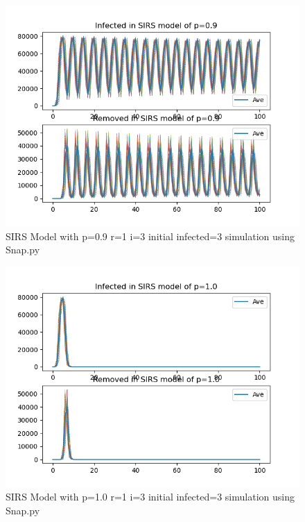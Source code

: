\documentclass{subfile}
\begin{document}
  \begin{figure}
  \includegraphics[scale=0.8]{sirsp09r1i3s3}
  \caption[SIRS p=0.9,r=1,i=3,init infected=3]{SIRS Model with p=0.9 r=1 i=3 initial infected=3 simulation using Snap.py}
  \end{figure}
  \begin{figure}
  \includegraphics[scale=0.8]{sirsp10r1i3s3}
  \caption[SIRS p=1.0,r=1,i=3,init infected=3]{SIRS Model with p=1.0 r=1 i=3 initial infected=3 simulation using Snap.py}
  \end{figure}
\end{document}
